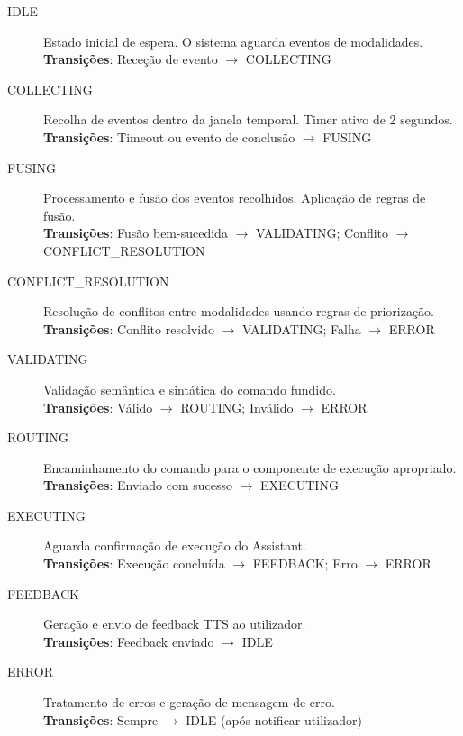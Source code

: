 \begin{description}
    \item[IDLE] Estado inicial de espera. O sistema aguarda eventos de modalidades. \\
    \textbf{Transições}: Receção de evento $\rightarrow$ COLLECTING

    \item[COLLECTING] Recolha de eventos dentro da janela temporal. Timer ativo de 2 segundos. \\
    \textbf{Transições}: Timeout ou evento de conclusão $\rightarrow$ FUSING

    \item[FUSING] Processamento e fusão dos eventos recolhidos. Aplicação de regras de fusão. \\
    \textbf{Transições}: Fusão bem-sucedida $\rightarrow$ VALIDATING; Conflito $\rightarrow$ CONFLICT\_RESOLUTION

    \item[CONFLICT\_RESOLUTION] Resolução de conflitos entre modalidades usando regras de priorização. \\
    \textbf{Transições}: Conflito resolvido $\rightarrow$ VALIDATING; Falha $\rightarrow$ ERROR

    \item[VALIDATING] Validação semântica e sintática do comando fundido. \\
    \textbf{Transições}: Válido $\rightarrow$ ROUTING; Inválido $\rightarrow$ ERROR

    \item[ROUTING] Encaminhamento do comando para o componente de execução apropriado. \\
    \textbf{Transições}: Enviado com sucesso $\rightarrow$ EXECUTING

    \item[EXECUTING] Aguarda confirmação de execução do Assistant. \\
    \textbf{Transições}: Execução concluída $\rightarrow$ FEEDBACK; Erro $\rightarrow$ ERROR

    \item[FEEDBACK] Geração e envio de feedback TTS ao utilizador. \\
    \textbf{Transições}: Feedback enviado $\rightarrow$ IDLE

    \item[ERROR] Tratamento de erros e geração de mensagem de erro. \\
    \textbf{Transições}: Sempre $\rightarrow$ IDLE (após notificar utilizador)
\end{description}

